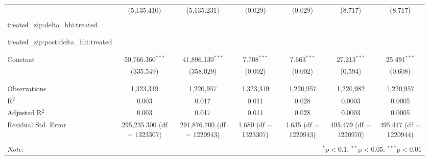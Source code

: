 \begin{table}[H]
{\begin{tabular}{@{\extracolsep{5pt}}lcccccc}
   & (5,135.410) & (5,135.231) & (0.029) & (0.029) & (8.717) & (8.717) \\  

   & & & & & & \\  

  treated\_zip:delta\_hhi:treated &  &  &  &  &  &  \\  

   &  &  &  &  &  &  \\  

   & & & & & & \\  

  treated\_zip:post:delta\_hhi:treated &  &  &  &  &  &  \\  

   &  &  &  &  &  &  \\  

   & & & & & & \\  

  Constant & 50,766.360$^{***}$ & 41,896.130$^{***}$ & 7.708$^{***}$ & 7.663$^{***}$ & 27.213$^{***}$ & 25.491$^{***}$ \\  

   & (335.549) & (358.029) & (0.002) & (0.002) & (0.594) & (0.608) \\  

   & & & & & & \\  

 \hline \\[-1.8ex]  

 Observations & 1,323,319 & 1,220,957 & 1,323,319 & 1,220,957 & 1,220,982 & 1,220,957 \\  

 R$^{2}$ & 0.003 & 0.017 & 0.011 & 0.028 & 0.0003 & 0.0005 \\  

 Adjusted R$^{2}$ & 0.003 & 0.017 & 0.011 & 0.028 & 0.0003 & 0.0005 \\  

 Residual Std. Error & 295,235.300 (df = 1323307) & 291,876.700 (df = 1220943) & 1.680 (df = 1323307) & 1.635 (df = 1220943) & 495.479 (df = 1220970) & 495.447 (df = 1220944) \\  

 \hline  

 \hline \\[-1.8ex]  

 \textit{Note:}  & \multicolumn{6}{r}{$^{*}$p$<$0.1; $^{**}$p$<$0.05; $^{***}$p$<$0.01} \\  

 \end{tabular}}  

 \end{table}  

